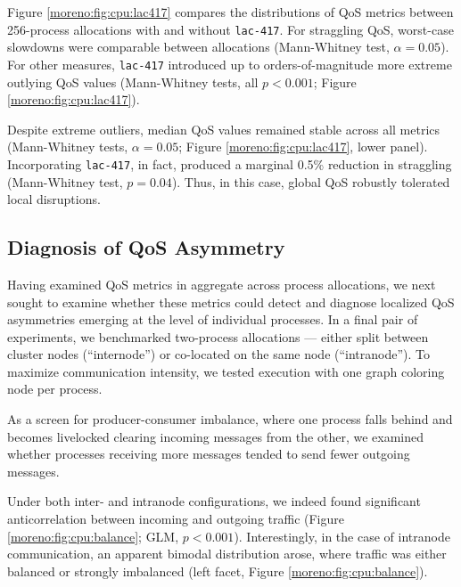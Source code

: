 Figure \ref{moreno:fig:cpu:lac417} compares the distributions of QoS metrics between 256-process allocations with and without \texttt{lac-417}.
For straggling QoS, worst-case slowdowns were comparable between allocations (Mann-Whitney test, $\alpha = 0.05$).
For other measures, \texttt{lac-417} introduced up to orders-of-magnitude more extreme outlying QoS values (Mann-Whitney tests, all $p<0.001$; Figure \ref{moreno:fig:cpu:lac417}).

Despite extreme outliers, median QoS values remained stable across all metrics (Mann-Whitney tests, $\alpha = 0.05$; Figure \ref{moreno:fig:cpu:lac417}, lower panel).
Incorporating \texttt{lac-417}, in fact, produced a marginal 0.5\% reduction in straggling (Mann-Whitney test, $p=0.04$).
Thus, in this case, global QoS robustly tolerated local disruptions.

\vspace{-4.0ex}
\subsection{Diagnosis of QoS Asymmetry}
\label{moreno:sec:case1:asymmetry}
\vspace{-2.0ex}

Having examined QoS metrics in aggregate across process allocations, we next sought to examine whether these metrics could detect and diagnose localized QoS asymmetries emerging at the level of individual processes.
In a final pair of experiments, we benchmarked two-process allocations --- either split between cluster nodes (``internode'') or co-located on the same node (``intranode'').
To maximize communication intensity, we tested execution with one graph coloring node per process.

As a screen for producer-consumer imbalance, where one process falls behind and becomes livelocked clearing incoming messages from the other, we examined whether processes receiving more messages tended to send fewer outgoing messages.

Under both inter- and intranode configurations, we indeed found significant anticorrelation between incoming and outgoing traffic (Figure \ref{moreno:fig:cpu:balance}; GLM, $p < 0.001$).
Interestingly, in the case of intranode communication, an apparent bimodal distribution arose, where traffic was either balanced or strongly imbalanced (left facet, Figure \ref{moreno:fig:cpu:balance}).

